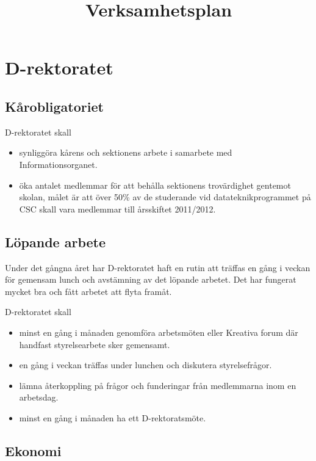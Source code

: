 \documentclass{dgovdoc}
\title{Verksamhetsplan}
\begin{document}
\maketitle

\section{D-rektoratet}

\subsection{Kårobligatoriet}

D-rektoratet skall

\begin{itemize}
\item synliggöra kårens och sektionens arbete i samarbete med Informationsorganet.
\item öka antalet medlemmar för att behålla sektionens trovärdighet gentemot
  skolan, målet är att över 50\% av de studerande vid datateknikprogrammet på CSC
  skall vara medlemmar till årsskiftet 2011/2012.
\end{itemize}

\subsection{Löpande arbete}

Under det gångna året har D-rektoratet haft en rutin att träffas en gång i
veckan för gemensam lunch och avstämning av det löpande arbetet. Det har
fungerat mycket bra och fått arbetet att flyta framåt.

D-rektoratet skall

\begin{itemize}
\item minst en gång i månaden genomföra arbetsmöten eller Kreativa forum där
  handfast styrelsearbete sker gemensamt.
\item en gång i veckan träffas under lunchen och diskutera styrelsefrågor.
\item lämna återkoppling på frågor och funderingar från medlemmarna inom en
  arbetsdag.
\item minst en gång i månaden ha ett D-rektoratsmöte.
\end{itemize}

\subsection{Ekonomi}
\end{document}
